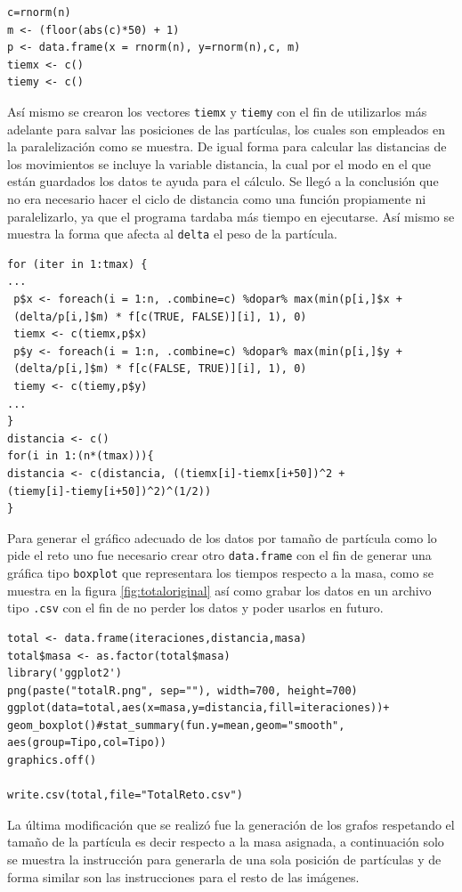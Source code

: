 \documentclass[a4paper]{article}
\begin{document}
\begin{lstlisting}[frame=single]
c=rnorm(n)
m <- (floor(abs(c)*50) + 1)
p <- data.frame(x = rnorm(n), y=rnorm(n),c, m)
tiemx <- c()
tiemy <- c()
\end{lstlisting}

Así mismo se crearon los vectores \texttt{tiemx} y \texttt{tiemy} con el fin de utilizarlos más adelante para salvar las posiciones de las partículas, los cuales son empleados en la paralelización como se muestra. De igual forma para calcular las distancias de los movimientos se incluye la variable distancia, la cual por el modo en el que están guardados los datos te ayuda para el cálculo. Se llegó a la conclusión que no era necesario hacer el ciclo de distancia como una función propiamente ni paralelizarlo, ya que el programa tardaba más tiempo en ejecutarse. Así mismo se muestra la forma que afecta al \texttt{delta} el peso de la partícula.

\begin{lstlisting}[frame=single]
for (iter in 1:tmax) {
...
 p$x <- foreach(i = 1:n, .combine=c) %dopar% max(min(p[i,]$x + 
 (delta/p[i,]$m) * f[c(TRUE, FALSE)][i], 1), 0)
 tiemx <- c(tiemx,p$x)
 p$y <- foreach(i = 1:n, .combine=c) %dopar% max(min(p[i,]$y + 
 (delta/p[i,]$m) * f[c(FALSE, TRUE)][i], 1), 0)
 tiemy <- c(tiemy,p$y)
...
}
distancia <- c()
for(i in 1:(n*(tmax))){
distancia <- c(distancia, ((tiemx[i]-tiemx[i+50])^2 + 
(tiemy[i]-tiemy[i+50])^2)^(1/2))
}
\end{lstlisting}
Para generar el gráfico adecuado de los datos por tamaño de partícula como lo pide el reto uno fue necesario crear otro \texttt{data.frame} con el fin de generar una gráfica tipo \texttt{boxplot} que representara los tiempos respecto a la masa, como se muestra en la figura \ref{fig:totaloriginal} así como grabar los datos en un archivo tipo \texttt{.csv} con el fin de no perder los datos y poder usarlos en futuro.

\begin{lstlisting}[frame=single]
total <- data.frame(iteraciones,distancia,masa)
total$masa <- as.factor(total$masa)
library('ggplot2')
png(paste("totalR.png", sep=""), width=700, height=700)
ggplot(data=total,aes(x=masa,y=distancia,fill=iteraciones))+
geom_boxplot()#stat_summary(fun.y=mean,geom="smooth",
aes(group=Tipo,col=Tipo))
graphics.off()

write.csv(total,file="TotalReto.csv")
\end{lstlisting}
La última modificación que se realizó fue la generación de los grafos respetando el tamaño de la partícula es decir respecto a la masa asignada, a continuación solo se muestra la instrucción para generarla de una sola posición de partículas y de forma similar son las instrucciones para el resto de las imágenes.
\end{document}
